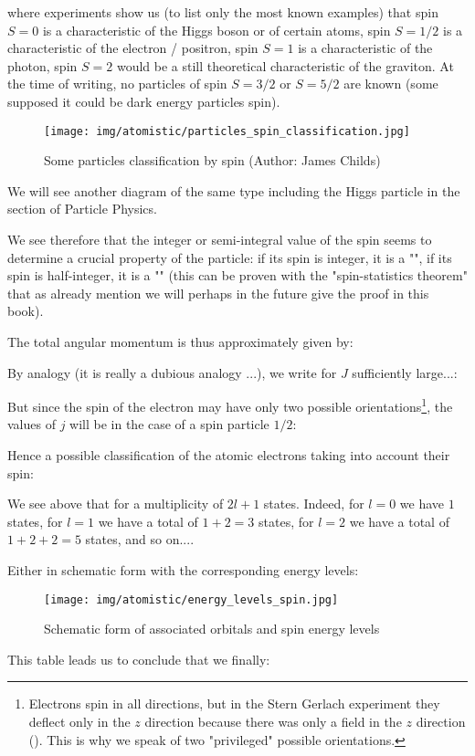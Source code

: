 	where experiments show us (to list only the most known examples) that spin $S=0$ is a characteristic of the Higgs boson or of certain atoms, spin $S=1/2$ is a characteristic of the electron / positron, spin $S=1$ is a characteristic of the photon, spin $S=2$ would be a still theoretical characteristic of the graviton. At the time of writing, no particles of spin $S=3/2$ or $S=5/2$ are known (some supposed it could be dark energy particles spin).
	\begin{figure}[H]
		\centering
		\texttt{[image: img/atomistic/particles\_spin\_classification.jpg]}	
		\caption{Some particles classification by spin (Author: James Childs)}
	\end{figure}
	We will see another diagram of the same type including the Higgs particle in the section of Particle Physics.
	
	We see therefore that the integer or semi-integral value of the spin seems to determine a crucial property of the particle: if its spin is integer, it is a "", if its spin is half-integer, it is a "" (this can be proven with the "spin-statistics theorem" that as already mention we will perhaps in the future give the proof in this book).
	
	The total angular momentum is thus approximately given by:
	
	By analogy (it is really a dubious analogy ...), we write for $J$ sufficiently large...:
	
	But since the spin of the electron may have only two possible orientations\footnote{Electrons spin in all directions, but in the Stern Gerlach experiment they deflect only in the $z$ direction because there was only a field in the $z$ direction (). This is why we speak of two "privileged" possible orientations.}, the values of $j$ will be in the case of a spin particle $1/2$:
	
	Hence a possible classification of the atomic electrons taking into account their spin:
	
	We see above that for a multiplicity of $2l+1$ states. Indeed, for $l=0$ we have $1$ states, for $l=1$ we have a total of $1+2=3$ states, for $l=2$ we have a total of $1+2+2=5$ states, and so on....
	
	Either in schematic form with the corresponding energy levels:
	\begin{figure}[H]
		\centering
		\texttt{[image: img/atomistic/energy\_levels\_spin.jpg]}	
		\caption{Schematic form of associated orbitals and spin energy levels}
	\end{figure}
	This table leads us to conclude that we finally:
	
